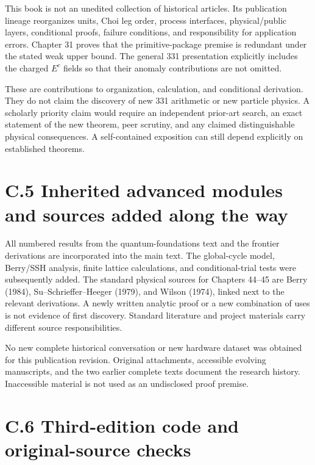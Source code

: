 \documentclass[
  11pt,
  oneside]{book}
\begin{document}
This book is not an unedited collection of historical articles. Its
publication lineage reorganizes units, Choi leg order, process
interfaces, physical/public layers, conditional proofs, failure
conditions, and responsibility for application errors. Chapter 31 proves
that the primitive-package premise is redundant under the stated weak
upper bound. The general 331 presentation explicitly includes the
charged \(E^c\) fields so that their anomaly contributions are not
omitted.

These are contributions to organization, calculation, and conditional
derivation. They do not claim the discovery of new 331 arithmetic or new
particle physics. A scholarly priority claim would require an
independent prior-art search, an exact statement of the new theorem,
peer scrutiny, and any claimed distinguishable physical consequences. A
self-contained exposition can still depend explicitly on established
theorems.

\section{C.5 Inherited advanced modules and sources added along the way}

All numbered results from the quantum-foundations text and the frontier
derivations are incorporated into the main text. The global-cycle model,
Berry/SSH analysis, finite lattice calculations, and conditional-trial
tests were subsequently added. The standard physical sources for
Chapters 44--45 are Berry (1984), Su--Schrieffer--Heeger (1979), and
Wilson (1974), linked next to the relevant derivations. A newly written
analytic proof or a new combination of uses is not evidence of first
discovery. Standard literature and project materials carry different
source responsibilities.

No new complete historical conversation or new hardware dataset was
obtained for this publication revision. Original attachments, accessible
evolving manuscripts, and the two earlier complete texts document the
research history. Inaccessible material is not used as an undisclosed
proof premise.

\section{C.6 Third-edition code and original-source checks}
\end{document}
